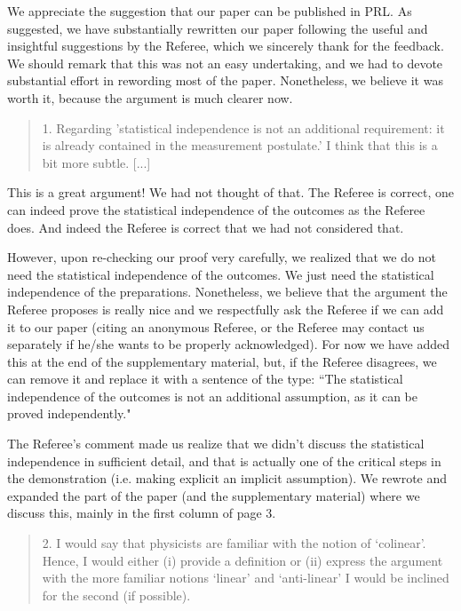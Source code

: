 \documentclass[11pt]{article}
\begin{document}
We appreciate the suggestion that our paper can be published in
PRL. As suggested, we have substantially rewritten our paper following
the useful and insightful suggestions by the Referee, which we
sincerely thank for the feedback. We should remark that this was not
an easy undertaking, and we had to devote substantial effort in
rewording most of the paper. Nonetheless, we believe it was worth it,
because the argument is much clearer now.

\begin{quote}
1. Regarding 'statistical independence is not an
additional requirement: it is already contained in the measurement
postulate.' I think that this is a bit more subtle. [...]
\end{quote}

This is a great argument! We had not thought of that. The Referee is
correct, one can indeed prove the statistical independence of the
outcomes as the Referee does. And indeed the Referee is correct that
we had not considered that.

However, upon re-checking our proof very carefully, we realized that
we do not need the statistical independence of the outcomes. We just
need the statistical independence of the preparations. Nonetheless, we
believe that the argument the Referee proposes is really nice and we
respectfully ask the Referee if we can add it to our paper (citing an
anonymous Referee, or the Referee may contact us separately if he/she
wants to be properly acknowledged). For now we have added this at the end of the
supplementary material, but, if the Referee disagrees, we can remove
it and replace it with a sentence of the type: ``The statistical
independence of the outcomes is not an additional assumption, as it
can be proved independently."

The Referee's comment made us realize that we didn't discuss the
statistical independence in sufficient detail, and that is actually
one of the critical steps in the demonstration (i.e. making explicit an
implicit assumption). We rewrote and expanded the part of the paper
(and the supplementary material) where we discuss this, mainly in the
first column of page 3.

\begin{quote}
2. I would say that physicists are familiar with the
notion of `colinear'.  Hence, I would either (i) provide a definition
or (ii) express the argument with the more familiar notions `linear'
and `anti-linear' I would be inclined for the second (if possible).
\end{quote}
\end{document}
